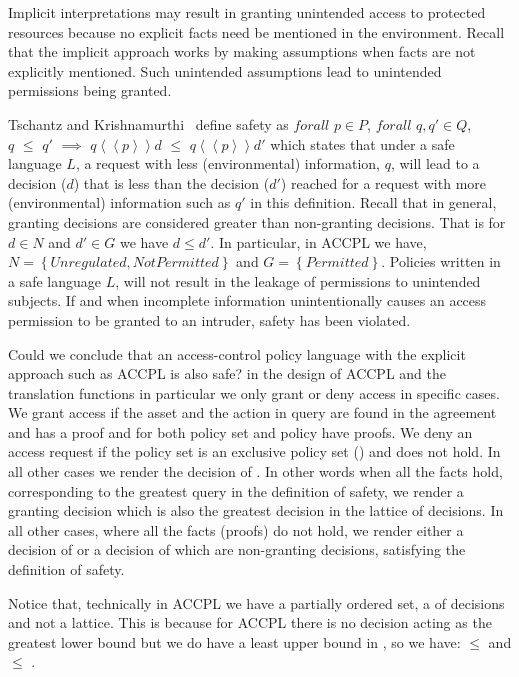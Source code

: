 Implicit interpretations may result in granting unintended access to protected resources because no explicit facts need be mentioned in the environment. Recall that the implicit approach works by making assumptions when facts are not explicitly mentioned. Such unintended assumptions lead to unintended permissions being granted.

Tschantz and Krishnamurthi~\cite{Tschantz} define safety as $forall$ $p \in P$, $forall$ $q, q' \in Q$, \\$q$ $\leq$ $q'$ $\implies$ $q \left\langle\left\langle p  \right\rangle\right\rangle d$ $\leq$ $q \left\langle\left\langle p  \right\rangle\right\rangle d'$ which states that under a safe language $L$, a request with less (environmental) information, $q$, will lead to a decision ($d$) that is less than the decision ($d'$) reached for a request with more (environmental) information such as $q'$ in this definition. Recall that in general, granting decisions are considered greater than non-granting decisions. That is for $d \in N$ and $d' \in G$ we have $d \leq d'$. In particular, in \ac{ACCPL} we have,  $N = \left\{ {Unregulated, NotPermitted}\right\}$ and $G = \left\{ {Permitted}\right\}$. Policies written in a safe language $L$, will not result in the leakage of permissions to unintended subjects. If and when incomplete information unintentionally causes an access permission to be granted to an intruder, safety has been violated.

Could we conclude that an access-control policy language with the explicit approach such as \ac{ACCPL} is also safe? in the design of \ac{ACCPL} and the translation functions in particular we only grant or deny access in specific cases. We grant access if the asset and the action in query are found in the agreement and  has a proof and  for both policy set and policy have proofs. We deny an access request if the policy set is an exclusive policy set () and  does not hold. In all other cases we render the decision of . In other words when all the facts hold, corresponding to the greatest query in the definition of safety, we render a granting decision which is also the greatest decision in the lattice of decisions. In all other cases, where all the facts (proofs) do not hold, we render either a decision of  or a decision of  which are non-granting decisions, satisfying the definition of safety.

Notice that, technically in \ac{ACCPL} we have a partially ordered set, a  of decisions and not a lattice. This is because for \ac{ACCPL} there is no decision acting as the greatest lower bound but we do have a least upper bound in , so we have:  $\leq$  and  $\leq$ .


